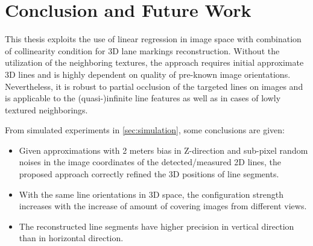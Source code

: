 
\chapter{Conclusion and Future Work}
\label{chap:conclusion}

This thesis exploits the use of linear regression in image space with combination of collinearity condition for 3D lane markings reconstruction. Without the utilization of the neighboring textures, the approach requires initial approximate 3D lines and is highly dependent on quality of pre-known image orientations. Nevertheless, it is robust to partial occlusion of the targeted lines on images and is applicable to the (quasi-)infinite line features as well as in cases of lowly textured neighborings. 

From simulated experiments in \cref{sec:simulation}, some conclusions are given:
\begin{itemize}
	\item Given approximations with 2 meters bias in Z-direction and sub-pixel random noises in the image coordinates of the detected/measured 2D lines, the proposed approach correctly refined the 3D positions of line segments.
	
	\item With the same line orientations in 3D space, the configuration strength increases with the increase of amount of covering images from different views.
	
	\item The reconstructed line segments have higher precision in vertical direction than in horizontal direction.
\end{itemize}


